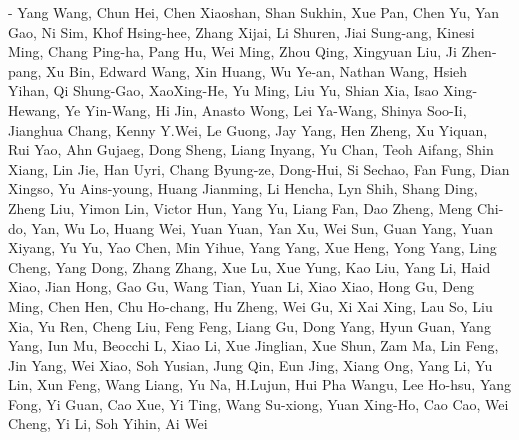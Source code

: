 \documentclass{article}
\begin{document}
- Yang Wang, Chun Hei, Chen Xiaoshan, Shan Sukhin, Xue Pan, Chen Yu, Yan Gao, Ni Sim, Khof Hsing-hee, Zhang Xijai, Li Shuren, Jiai Sung-ang, Kinesi Ming, Chang Ping-ha, Pang Hu, Wei Ming, Zhou Qing, Xingyuan Liu, Ji Zhen-pang, Xu Bin, Edward Wang, Xin Huang, Wu Ye-an, Nathan Wang, Hsieh Yihan, Qi Shung-Gao, XaoXing-He, Yu Ming, Liu Yu, Shian Xia, Isao Xing-Hewang, Ye Yin-Wang, Hi Jin, Anasto Wong, Lei Ya-Wang, Shinya Soo-Ii, Jianghua Chang, Kenny Y.Wei, Le Guong, Jay Yang, Hen Zheng, Xu Yiquan, Rui Yao, Ahn Gujaeg, Dong Sheng, Liang Inyang, Yu Chan, Teoh Aifang, Shin Xiang, Lin Jie, Han Uyri, Chang Byung-ze, Dong-Hui, Si Sechao, Fan Fung, Dian Xingso, Yu Ains-young, Huang Jianming, Li Hencha, Lyn Shih, Shang Ding, Zheng Liu, Yimon Lin, Victor Hun, Yang Yu, Liang Fan, Dao Zheng, Meng Chi-do, Yan, Wu Lo, Huang Wei, Yuan Yuan, Yan Xu, Wei Sun, Guan Yang, Yuan Xiyang, Yu Yu, Yao Chen, Min Yihue, Yang Yang, Xue Heng, Yong Yang, Ling Cheng, Yang Dong, Zhang Zhang, Xue Lu, Xue Yung, Kao Liu, Yang Li, Haid Xiao, Jian Hong, Gao Gu, Wang Tian, Yuan Li, Xiao Xiao, Hong Gu, Deng Ming, Chen Hen, Chu Ho-chang, Hu Zheng, Wei Gu, Xi Xai Xing, Lau So, Liu Xia, Yu Ren, Cheng Liu, Feng Feng, Liang Gu, Dong Yang, Hyun Guan, Yang Yang, Iun Mu, Beocchi L, Xiao Li, Xue Jinglian, Xue Shun, Zam Ma, Lin Feng, Jin Yang, Wei Xiao, Soh Yusian, Jung Qin, Eun Jing, Xiang Ong, Yang Li, Yu Lin, Xun Feng, Wang Liang, Yu Na, H.Lujun, Hui Pha Wangu, Lee Ho-hsu, Yang Fong, Yi Guan, Cao Xue, Yi Ting, Wang Su-xiong, Yuan Xing-Ho, Cao Cao, Wei Cheng, Yi Li, Soh Yihin, Ai Wei
\end{document}
